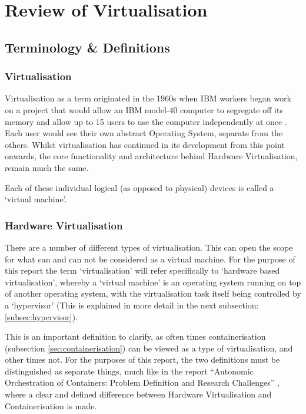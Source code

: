 



\chapter{Review of Virtualisation}

\section{Terminology \& Definitions}


\subsection{Virtualisation}
Virtualisation as a term originated in the 1960s when IBM workers began work on a project that would allow an IBM model-40 computer to segregate off its memory and allow up to 15 users to use the computer independently at once \citep{Lindquist1966}. Each user would see their own abstract Operating System, separate from the others. Whilst virtualisation has continued in its development from this point onwards, the core functionality and architecture behind Hardware Virtualisation, remain much the same.

Each of these individual logical (as opposed to physical) devices is called a `virtual machine'.

\subsection{Hardware Virtualisation}
\label{subsec:HardwareVirtualisation}
There are a number of different types of virtualisation. This can open the scope for what can and can not be considered as a virtual machine. For the purpose of this report the term `virtualisation' will refer specifically to `hardware based virtualisation', whereby a `virtual machine' is an operating system running on top of another operating system, with the virtualisation task itself being controlled by a `hypervisor' (This is explained in more detail in the next subsection: \ref{subsec:hypervisor}).

This is an important definition to clarify, as often times containerisation (subsection \ref{sec:containerisation}) can be viewed as a type of virtualisation, and other times not. For the purposes of this report, the two definitions must be distinguished as separate things, much like in the report ``Autonomic Orchestration of Containers: Problem Definition and Research Challenges'' \citep{casalicchio2016}, where a clear and defined difference between Hardware Virtualisation and Containerisation is made.

